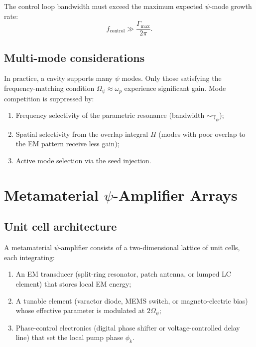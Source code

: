 \documentclass[12pt,aps,prd,twocolumn,superscriptaddress,nofootinbib]{revtex4-2}
\newcommand{\Opsi}{\Omega_\psi}
\newcommand{\gpsi}{\gamma_\psi}
\begin{document}
The control loop bandwidth must exceed the maximum expected $\psi$-mode
growth rate:
\begin{equation}
  f_{\mathrm{control}} \gg \frac{\Gamma_{\max}}{2\pi}.
  \label{eq:control_BW}
\end{equation}

\subsection{Multi-mode considerations}

In practice, a cavity supports many $\psi$ modes.  Only those satisfying
the frequency-matching condition $\Opsi \approx \omega_p$ experience
significant gain.  Mode competition is suppressed by:
\begin{enumerate}[noitemsep]
  \item Frequency selectivity of the parametric resonance (bandwidth
    $\sim \gpsi$);
  \item Spatial selectivity from the overlap integral $H$ (modes with
    poor overlap to the EM pattern receive less gain);
  \item Active mode selection via the seed injection.
\end{enumerate}


\section{Metamaterial $\psi$-Amplifier Arrays}
\label{sec:metamaterial}

\subsection{Unit cell architecture}

A metamaterial $\psi$-amplifier consists of a two-dimensional lattice of
unit cells, each integrating:
\begin{enumerate}[noitemsep]
  \item An EM transducer (split-ring resonator, patch antenna, or
    lumped LC element) that stores local EM energy;
  \item A tunable element (varactor diode, MEMS switch, or
    magneto-electric bias) whose effective parameter is modulated at
    $2\Opsi$;
  \item Phase-control electronics (digital phase shifter or
    voltage-controlled delay line) that set the local pump phase
    $\phi_k$.
\end{enumerate}
\end{document}
